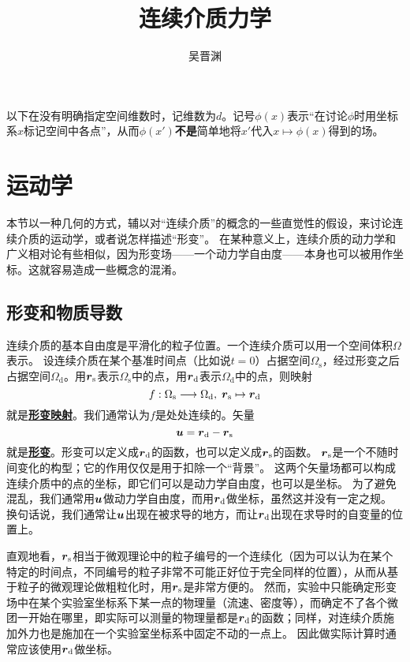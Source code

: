 \documentclass[hyperref, UTF8, a4paper]{ctexart}
\title{连续介质力学}
\author{吴晋渊}
\newcommand{\concept}[1]{\underline{\textbf{#1}}}
\renewcommand{\emph}{\textbf}
\begin{document}
\maketitle

以下在没有明确指定空间维数时，记维数为$d$。记号$\phi(x)$表示“在讨论$\phi$时用坐标系$x$标记空间中各点”，从而$\phi(x')$\emph{不是}简单地将$x'$代入$x \mapsto \phi(x)$得到的场。

\section{运动学}

本节以一种几何的方式，辅以对“连续介质”的概念的一些直觉性的假设，来讨论连续介质的运动学，或者说怎样描述“形变”。
在某种意义上，连续介质的动力学和广义相对论有些相似，因为形变场——一个动力学自由度——本身也可以被用作坐标。这就容易造成一些概念的混淆。

\subsection{形变和物质导数}

连续介质的基本自由度是平滑化的粒子位置。一个连续介质可以用一个空间体积$\Omega$表示。
设连续介质在某个基准时间点（比如说$t=0$）占据空间$\Omega_\text{s}$，经过形变之后占据空间$\Omega_\text{d}$。用$\vb*{r}_\text{s}$表示$\Omega_\text{s}$中的点，用$\vb*{r}_\text{d}$表示$\Omega_\text{d}$中的点，则映射
\[
    f: \Omega_\text{s} \longrightarrow \Omega_\text{d}, \; \vb*{r}_\text{s} \mapsto \vb*{r}_\text{d}
\]
就是\concept{形变映射}。我们通常认为$f$是处处连续的。矢量
\begin{equation}
    \vb*{u} = \vb*{r}_\text{d} - \vb*{r}_\text{s}
\end{equation}
就是\concept{形变}。形变可以定义成$\vb*{r}_\text{d}$的函数，也可以定义成$\vb*{r}_\text{s}$的函数。
$\vb*{r}_\text{s}$是一个不随时间变化的构型；它的作用仅仅是用于扣除一个“背景”。
这两个矢量场都可以构成连续介质中的点的坐标，即它们可以是动力学自由度，也可以是坐标。
为了避免混乱，我们通常用$\vb*{u}$做动力学自由度，而用$\vb*{r}_\text{d}$做坐标，虽然这并没有一定之规。
换句话说，我们通常让$\vb*{u}$出现在被求导的地方，而让$\vb*{r}_\text{d}$出现在求导时的自变量的位置上。

直观地看，$\vb*{r}_\text{s}$相当于微观理论中的粒子编号的一个连续化（因为可以认为在某个特定的时间点，不同编号的粒子非常不可能正好位于完全同样的位置），从而从基于粒子的微观理论做粗粒化时，用$\vb*{r}_\text{s}$是非常方便的。
然而，实验中只能确定形变场中在某个实验室坐标系下某一点的物理量（流速、密度等），而确定不了各个微团一开始在哪里，即实际可以测量的物理量都是$\vb*{r}_\text{d}$的函数；同样，对连续介质施加外力也是施加在一个实验室坐标系中固定不动的一点上。
因此做实际计算时通常应该使用$\vb*{r}_\text{d}$做坐标。
\end{document}
